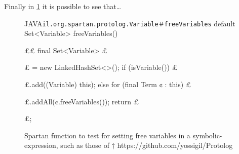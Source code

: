 Finally in \cref{figure:shock-3} it is possible to see that…

\begin{figure}[ht]
    \caption{%
      Spartan function to test for setting free variables in a symbolic-expression, such as those of \protect\Prolog†{%
      https://github.com/yossigil/Protolog
      }
    }
\label{figure:shock-3}
\begin{Code}{JAVA}{\scriptsize\texttt{il.org.spartan.protolog.Variable＃freeVariables}}
default Set<Variable> freeVariables() {££
    final Set<Variable> £\ignore$£$ = new LinkedHashSet<>();
    if (isVariable())
     £\ignore$£$.add((Variable) this);
    else
      for (final Term ¢ : this)
       £\ignore$£$.addAll(¢.freeVariables());
    return £\ignore$£$;
  }
\end{Code}
\end{figure}

